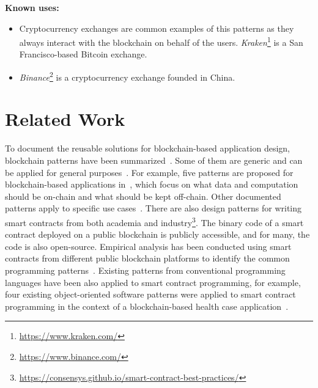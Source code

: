 \vspace{0.5em}\noindent \textbf{Known uses:}
\begin{itemize}
  \item Cryptocurrency exchanges are common examples of this patterns as they always interact with the blockchain on behalf of the users. \textit{Kraken}\footnote{\url{https://www.kraken.com/}} is a San Francisco-based Bitcoin exchange. 
  \item \textit{Binance}\footnote{\url{https://www.binance.com/}} is a cryptocurrency exchange founded in China. 
\end{itemize}
  


\section{Related Work}
\label{sec:relatedwork}


To document the reusable solutions for blockchain-based application design, blockchain patterns have been summarized~\cite{Dilum:migrationpattern,Lu:patterns,2020-Muehlberger-BPM-BC,Eberhardt2017,patternICSA2018,securityblockchainpattern}.
Some of them are generic and can be applied for general purposes~\cite{2020-Muehlberger-BPM-BC,Eberhardt2017,patternICSA2018}. For example, five patterns are proposed for blockchain-based applications in~\cite{Eberhardt2017}, which focus on what data and computation should be on-chain and what should be kept off-chain. Other documented patterns apply to specific use cases~\cite{Dilum:migrationpattern,Lu:patterns}. 
There are also design patterns for writing smart contracts from both academia and industry\footnote{\url{https://consensys.github.io/smart-contract-best-practices/}}. The binary code of a smart contract deployed on a public blockchain is publicly accessible, and for many, the code is also open-source. Empirical analysis has been conducted using smart contracts from different public blockchain platforms to identify the common programming patterns~\cite{designPatterns1,Zdun:patterns,Zdun:patterns2}. Existing patterns from conventional programming languages have been also applied to smart contract programming, for example, four existing object-oriented software patterns were applied to smart contract programming in the context of a blockchain-based health case application~\cite{factorypattern}.
 
